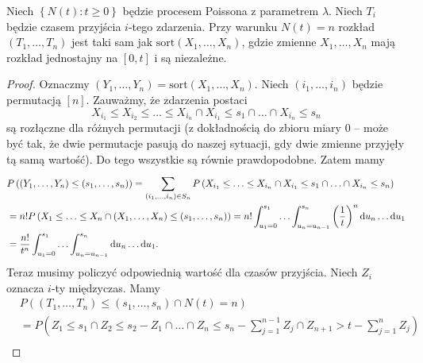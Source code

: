 \begin{theorem}
	Niech \(\left\{ N\left( t  \right) : t\ge 0 \right\} \) będzie procesem Poissona z parametrem \(\lambda\). Niech \(T_i\) będzie czasem przyjścia \(i\)-tego zdarzenia. Przy warunku \(N\left( t  \right) = n \) rozkład \(\left( T_1,\ldots,T_n \right) \) jest taki sam jak \(\mathrm{sort}\left( X_1,\ldots,X_n \right) \), gdzie zmienne \(X_1,\ldots,X_n\) mają rozkład jednostajny na \([0,t]\) i są niezależne.
\end{theorem}
\begin{proof}
	Oznaczmy \(\left( Y_1,\ldots,Y_n \right) = \mathrm{sort}\left( X_1,\ldots,X_n \right) \). Niech \(\left( i_1,\ldots,i_n \right) \) będzie permutacją \([n]\). Zauważmy, że zdarzenia postaci
	\[ X_{i_1} \le X_{i_2} \le \ldots \le X_{i_n} \cap X_{i_1} \le s_1 \cap \ldots \cap X_{i_n}\le s_n \]
	są rozłączne dla różnych permutacji (z dokładnością do zbioru miary \(0\) -- może być tak, że dwie permutacje pasują do naszej sytuacji, gdy dwie zmienne przyjęły tą samą wartość). Do tego wszystkie są równie prawdopodobne. Zatem mamy
	\begin{align*}
		 & P\left( \left( Y_1,\ldots,Y_n \right) \le \left( s_1,\ldots,s_n \right)  \right)  = \sum_{\left( i_1,\ldots,i_n \right) \in S_n}^{} P\left( X_{i_1}\le \ldots\le X_{i_n} \cap X_{i_1} \le s_1 \cap \ldots \cap X_{i_n}\le s_n \right) \\
		 & = n! P\left( X_1\le \ldots\le X_n \cap \left( X_1,\ldots,X_n \right) \le \left( s_1,\ldots,s_n \right)  \right) = n!\int_{u_1=0}^{s_1} \ldots \int_{u_n=u_{n-1}}^{s_n} \left( \frac{1}{t} \right) ^{n} \mathop{}\!\mathrm{d}{u_n} \ldots \mathop{}\!\mathrm{d}{u_{1}} \\
		 & = \frac{n!}{t ^{n}} \int_{u_1=0}^{s_1} \ldots \int_{u_n=u_{n-1}}^{s_n} \mathop{}\!\mathrm{d}{u_n} \ldots\mathop{}\!\mathrm{d}{u_1} .
	\end{align*}
	Teraz musimy policzyć odpowiednią wartość dla czasów przyjścia. Niech \(Z_i\) oznacza \(i\)-ty międzyczas. Mamy
	\begin{align*}
		 & P\left( \left( T_1,\ldots,T_n \right) \le \left( s_1,\ldots,s_n \right) \cap  N\left( t  \right) = n \right)                                                                                                                                   \\
		 & = P\left( Z_1\le s_1 \cap Z_2\le s_2-Z_1 \cap \ldots\cap Z_n \le s_n - \sum_{j=1}^{n-1} Z_j \cap Z_{n+1} > t- \sum_{j=1}^{n} Z_j \right)                                                                                                       \\

\end{align*}
\end{proof}
